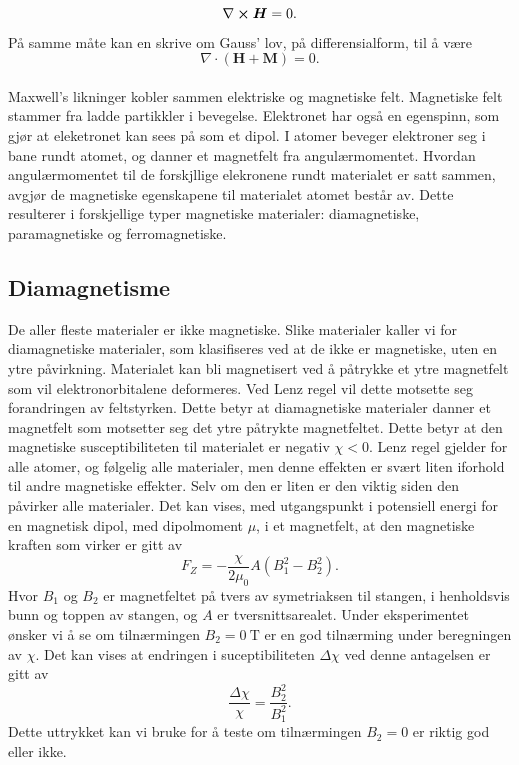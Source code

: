 \documentclass[%
 reprint,
 amsmath,amssymb,
 aps,
]{revtex4-1}
\begin{document}
\begin{equation}
  \nabla \cross \bm{H} = 0.
\end{equation}På samme måte kan en skrive om Gauss' lov, på differensialform, til å være
\begin{equation}
  \nabla \cdot \left(\bm{H}+\bm{M}\right) = 0.
\end{equation}
\\
Maxwell's likninger kobler sammen elektriske og magnetiske felt. Magnetiske felt stammer fra ladde partikkler i bevegelse. Elektronet har også en egenspinn, som gjør at eleketronet kan sees på som et dipol. I atomer beveger elektroner seg i bane rundt atomet, og danner et magnetfelt fra angulærmomentet. Hvordan angulærmomentet til de forskjllige elekronene rundt materialet er satt sammen, avgjør de magnetiske egenskapene til materialet atomet består av. Dette resulterer i forskjellige typer magnetiske materialer: diamagnetiske, paramagnetiske og ferromagnetiske.
\subsection{Diamagnetisme}
De aller fleste materialer er ikke magnetiske. Slike materialer kaller vi for diamagnetiske materialer, som klasifiseres ved at de ikke er magnetiske, uten en ytre påvirkning. Materialet kan bli magnetisert ved å påtrykke et ytre magnetfelt som vil elektronorbitalene deformeres. Ved Lenz regel vil dette motsette seg forandringen av feltstyrken. Dette betyr at diamagnetiske materialer danner et magnetfelt som motsetter seg det ytre påtrykte magnetfeltet. Dette betyr at den magnetiske susceptibiliteten til materialet er negativ $\chi < 0$. Lenz regel gjelder for alle atomer, og følgelig alle materialer, men denne effekten er svært liten iforhold til andre magnetiske effekter. Selv om den er liten er den viktig siden den påvirker alle materialer. Det kan vises, med utgangspunkt i potensiell energi for en magnetisk dipol, med dipolmoment $\mu$, i et magnetfelt, at den magnetiske kraften som virker er gitt av
\begin{equation}
  F_Z = -\frac{\chi}{2\mu_0}A\left(B_1^2 - B_2^2\right). \label{vismut}
\end{equation}
Hvor $B_1$ og $B_2$ er magnetfeltet på tvers av symetriaksen til stangen, i henholdsvis bunn og toppen av stangen, og $A$ er tversnittsarealet. Under eksperimentet ønsker vi å se om tilnærmingen $B_2=\SI{0}{\tesla}$ er en god tilnærming under beregningen av $\chi$. Det kan vises at endringen i suceptibiliteten $\Delta \chi$ ved denne antagelsen er gitt av
\begin{equation}
  \frac{\Delta \chi}{\chi} = \frac{B_2^2}{B_1^2}. \label{test_chi}
\end{equation}
Dette uttrykket kan vi bruke for å teste om tilnærmingen $B_2=0$ er riktig god eller ikke.
\end{document}
